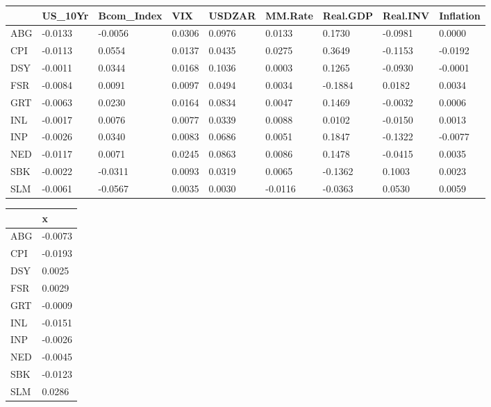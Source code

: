 \documentclass[11pt,preprint, authoryear]{elsarticle}
\let\origtable\table
\let\endorigtable\endtable
\renewenvironment{table}[1][2] {
    \expandafter\origtable\expandafter[H]
} {
    \endorigtable
}
\numberwithin{equation}{section}
\numberwithin{figure}{section}
\numberwithin{table}{section}
\begin{document}
\begin{table}[H]

\caption{\label{tab:Beta_F}Factor Beta's: Financial}
\centering
\begin{tabular}[t]{l|l|l|l|l|l|l|l|l}
\hline
  & US\_10Yr & Bcom\_Index & VIX & USDZAR & MM.Rate & Real.GDP & Real.INV & Inflation\\
\hline
ABG & -0.0133 & -0.0056 & 0.0306 & 0.0976 & 0.0133 & 0.1730 & -0.0981 & 0.0000\\
\hline
CPI & -0.0113 & 0.0554 & 0.0137 & 0.0435 & 0.0275 & 0.3649 & -0.1153 & -0.0192\\
\hline
DSY & -0.0011 & 0.0344 & 0.0168 & 0.1036 & 0.0003 & 0.1265 & -0.0930 & -0.0001\\
\hline
FSR & -0.0084 & 0.0091 & 0.0097 & 0.0494 & 0.0034 & -0.1884 & 0.0182 & 0.0034\\
\hline
GRT & -0.0063 & 0.0230 & 0.0164 & 0.0834 & 0.0047 & 0.1469 & -0.0032 & 0.0006\\
\hline
INL & -0.0017 & 0.0076 & 0.0077 & 0.0339 & 0.0088 & 0.0102 & -0.0150 & 0.0013\\
\hline
INP & -0.0026 & 0.0340 & 0.0083 & 0.0686 & 0.0051 & 0.1847 & -0.1322 & -0.0077\\
\hline
NED & -0.0117 & 0.0071 & 0.0245 & 0.0863 & 0.0086 & 0.1478 & -0.0415 & 0.0035\\
\hline
SBK & -0.0022 & -0.0311 & 0.0093 & 0.0319 & 0.0065 & -0.1362 & 0.1003 & 0.0023\\
\hline
SLM & -0.0061 & -0.0567 & 0.0035 & 0.0030 & -0.0116 & -0.0363 & 0.0530 & 0.0059\\
\hline
\end{tabular}
\end{table}

\begin{table}[H]

\caption{\label{tab:Alpha_F}Factor Alpha's: Financial}
\centering
\begin{tabular}[t]{l|l}
\hline
  & x\\
\hline
ABG & -0.0073\\
\hline
CPI & -0.0193\\
\hline
DSY & 0.0025\\
\hline
FSR & 0.0029\\
\hline
GRT & -0.0009\\
\hline
INL & -0.0151\\
\hline
INP & -0.0026\\
\hline
NED & -0.0045\\
\hline
SBK & -0.0123\\
\hline
SLM & 0.0286\\
\hline
\end{tabular}
\end{table}
\end{document}
